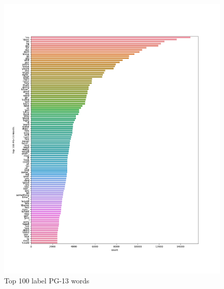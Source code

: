 \documentclass[a4paper]{article}
\begin{document}
\begin{figure}[ht]
    \centering
    \includegraphics[width=1\textwidth]{../stats/top_100_PG-13_words.png}
    \caption{Top 100 label PG-13 words}
\end{figure}
\end{document}
